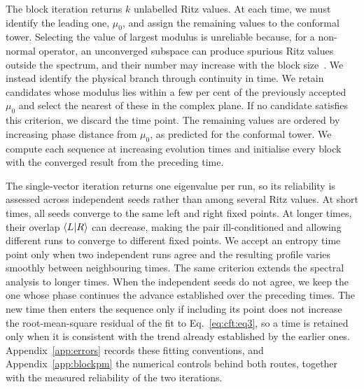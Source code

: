The block iteration returns $k$ unlabelled Ritz values. At each time, we must identify the leading one, $\mu_0$, and assign the remaining values to the conformal tower. Selecting the value of largest modulus is unreliable because, for a non-normal operator, an unconverged subspace can produce spurious Ritz values outside the spectrum, and their number may increase with the block size~\cite{saad1992}. We instead identify the physical branch through continuity in time. We retain candidates whose modulus lies within a few per cent of the previously accepted $\mu_0$ and select the nearest of these in the complex plane. If no candidate satisfies this criterion, we discard the time point. The remaining values are ordered by increasing phase distance from $\mu_0$, as predicted for the conformal tower. We compute each sequence at increasing evolution times and initialise every block with the converged result from the preceding time.

The single-vector iteration returns one eigenvalue per run, so its reliability is assessed across independent seeds rather than among several Ritz values. At short times, all seeds converge to the same left and right fixed points. At longer times, their overlap $\braket{L}{R}$ can decrease, making the pair ill-conditioned and allowing different runs to converge to different fixed points. We accept an entropy time point only when two independent runs agree and the resulting profile varies smoothly between neighbouring times. The same criterion extends the spectral analysis to longer times. When the independent seeds do not agree, we keep the one whose phase continues the advance established over the preceding times. The new time then enters the sequence only if including its point does not increase the root-mean-square residual of the fit to Eq.~\eqref{eq:cft:eq3}, so a time is retained only when it is consistent with the trend already established by the earlier ones. Appendix~\ref{app:errors} records these fitting conventions, and Appendix~\ref{app:blockpm} the numerical controls behind both routes, together with the measured reliability of the two iterations.
